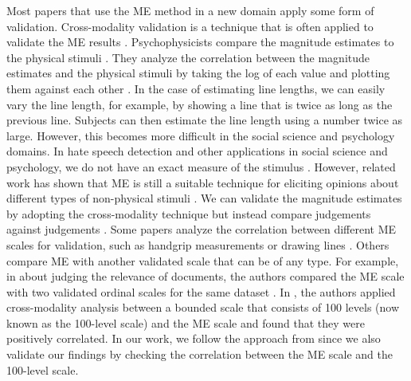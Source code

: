 %
Most papers that use the ME method in a new domain apply some form of validation. Cross-modality validation is a technique that is often applied to validate the ME results \citep{bard1996magnitude}.
%
Psychophysicists compare the magnitude estimates to the physical stimuli \citep{bard1996magnitude}.
%
They analyze the correlation between the magnitude estimates and the physical stimuli by taking the log of each value and plotting them against each other \citep{bard1996magnitude}.
%
In the case of estimating line lengths, we can easily vary the line length, for example, by showing a line that is twice as long as the previous line. Subjects can then estimate the line length using a number twice as large.
%
However, this becomes more difficult in the social science and psychology domains.
%
In hate speech detection and other applications in social science and psychology, we do not have an exact measure of the stimulus \citep{bard1996magnitude}.
%
However, related work has shown that ME is still a suitable technique for eliciting opinions about different types of non-physical stimuli \citep{bard1996magnitude, mcgee2004master, maddalena2017crowdsourcing, lodge1979comparisons}.
%
We can validate the magnitude estimates by adopting the cross-modality technique but instead compare judgements against judgements \citep{bard1996magnitude, lodge1979comparisons}.
%
Some papers analyze the correlation between different ME scales for validation, such as handgrip measurements or drawing lines \citep{bard1996magnitude, lodge1976calibration}.
%
Others compare ME with another validated scale that can be of any type.
%
For example, in \cite{maddalena2017crowdsourcing} about judging the relevance of documents, the authors compared the ME scale with two validated ordinal scales for the same dataset \citep{maddalena2017crowdsourcing}.
%
In \citet{roitero2018fine}, the authors applied cross-modality analysis between a bounded scale that consists of 100 levels (now known as the 100-level scale) and the ME scale and found that they were positively correlated.
%
In our work, we follow the approach from \citet{roitero2018fine} since we also validate our findings by checking the correlation between the ME scale and the 100-level scale.
%

